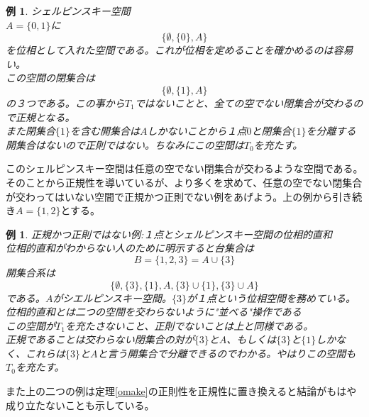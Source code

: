 \documentclass{jsarticle}
\newtheorem{exam}[thm]{例}
\begin{document}
\begin{exam}シェルピンスキー空間\\
$A=\{0,1\}$に
\[
\{\emptyset , \{0\},A\}
\]
を位相として入れた空間である。これが位相を定めることを確かめるのは容易い。\\ 
この空間の閉集合は
\[
\{\emptyset , \{1\},A\}
\]
の３つである。この事から$T_1$ではないことと、全ての空でない閉集合が交わるので正規となる。
\\ また閉集合$\{1\}$を含む開集合は$A$しかないことから１点$0$と閉集合$\{1\}$を分離する開集合はないので正則ではない。ちなみにこの空間は$T_0$を充たす。
\end{exam}
このシェルピンスキー空間は任意の空でない閉集合が交わるような空間である。そのことから正規性を導いているが、より多くを求めて、任意の空でない閉集合が交わってはいない空間で正規かつ正則でない例をあげよう。上の例から引き続き$A=\{1,2\}$とする。
\begin{exam}正規かつ正則ではない例:１点とシェルピンスキー空間の位相的直和\\ 
位相的直和がわからない人のために明示すると台集合は
\[
B=\{ 1,2,3\}=A\cup \{3\}
\]
開集合系は
\[
\{ \emptyset , \{3\},\{1\},A,\{3\}\cup \{1\},\{3\}\cup A \}
\]	である。$A$がシエルピンスキー空間。$\{3\}$が１点という位相空間を務めている。位相的直和とは二つの空間を交わらないように"並べる"操作である\\ 
この空間が$T_1$を充たさないこと、正則でないことは上と同様である。\\ 
正規であることは交わらない閉集合の対が$\{ 3 \}$と$A$、もしくは$\{3\}$と$\{1\}$しかなく、これらは$\{3\}$と$A$と言う開集合で分離できるのでわかる。やはりこの空間も$T_0$を充たす。
\end{exam}
また上の二つの例は定理\ref{omake}の正則性を正規性に置き換えると結論がもはや成り立たないことも示している。
\end{document}

